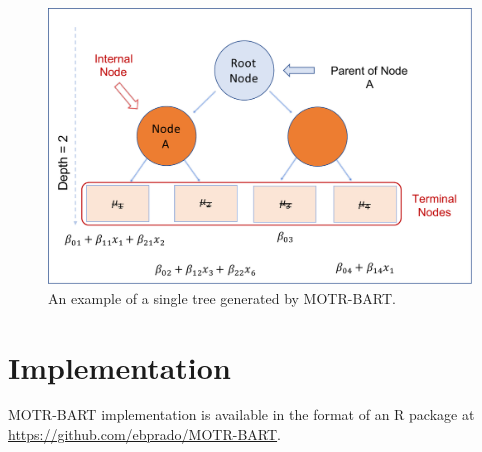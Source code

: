 \documentclass[
    ,title     = {{Bayesian Additive Regression Trees with Model Trees}}
    ,author    = {{Estevao B. Prado}}
    ,subject   = {{This is the subject of my work}}
   ,toplogo   = {{header_poster}}
,longtitle
]{dtuposter}
\begin{document}
\begin{dtupostercontent}
\begin{figure}
\includegraphics[width=.95\linewidth,origin=c]{Model_trees_plot2.pdf}
\caption{An example of a single tree generated by MOTR-BART.}
\end{figure}


\section{Implementation}

MOTR-BART implementation is available in the format of an R package at \url{https://github.com/ebprado/MOTR-BART}.



\end{dtupostercontent}
\end{document}
